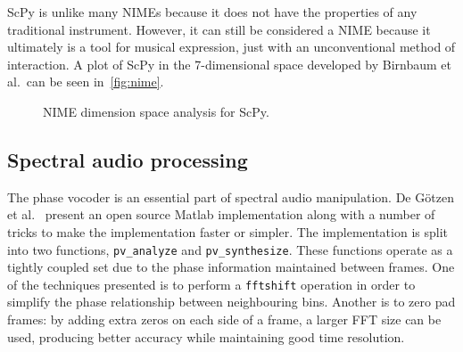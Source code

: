\documentclass{article}
\begin{document}
ScPy is unlike many NIMEs because it does not have the properties of any traditional instrument.
However, it can still be considered a NIME because it ultimately is a tool for musical expression,
just with an unconventional method of interaction. A plot of ScPy in the 7-dimensional space
developed by Birnbaum et al.\ can be seen in~\autoref{fig:nime}.

\begin{figure}[ht]
    \caption{NIME dimension space analysis for ScPy.}\label{fig:nime}
    \begin{center}
    \end{center}
\end{figure}

\subsection{Spectral audio processing}

The phase vocoder is an essential part of spectral audio manipulation. De G{\"o}tzen et
al.~\cite{de2000traditional} present an open source Matlab implementation along with a number of
tricks to make the implementation faster or simpler. The implementation is split into two
functions, \texttt{pv\_analyze} and \texttt{pv\_synthesize}. These functions operate as a tightly
coupled set due to the phase information maintained between frames. One of the techniques presented
is to perform a \texttt{fftshift} operation in order to simplify the phase relationship between
neighbouring bins. Another is to zero pad frames: by adding extra zeros on each side of a frame, a
larger FFT size can be used, producing better accuracy while maintaining good time resolution.
\end{document}
